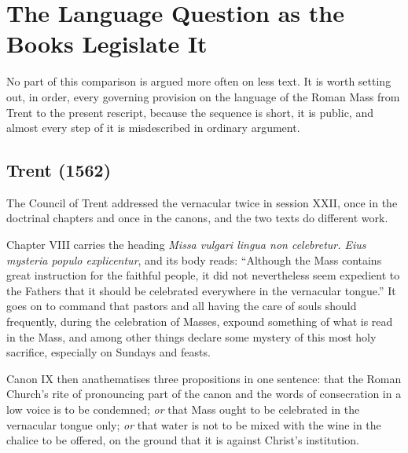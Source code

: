 \section{The Language Question as the Books Legislate It}

No part of this comparison is argued more often on less text. It is worth setting out, in order, every governing provision on the language of the Roman Mass from Trent to the present rescript, because the sequence is short, it is public, and almost every step of it is misdescribed in ordinary argument.

\subsection{Trent (1562)}

The Council of Trent addressed the vernacular twice in session XXII, once in the doctrinal chapters and once in the canons, and the two texts do different work.

Chapter VIII carries the heading \emph{Missa vulgari lingua non celebretur. Eius mysteria populo explicentur}, and its body reads: ``Although the Mass contains great instruction for the faithful people, it did not nevertheless seem expedient to the Fathers that it should be celebrated everywhere in the vernacular tongue.'' It goes on to command that pastors and all having the care of souls should frequently, during the celebration of Masses, expound something of what is read in the Mass, and among other things declare some mystery of this most holy sacrifice, especially on Sundays and feasts.

Canon IX then anathematises three propositions in one sentence: that the Roman Church's rite of pronouncing part of the canon and the words of consecration in a low voice is to be condemned; \emph{or} that Mass ought to be celebrated in the vernacular tongue only; \emph{or} that water is not to be mixed with the wine in the chalice to be offered, on the ground that it is against Christ's institution.

